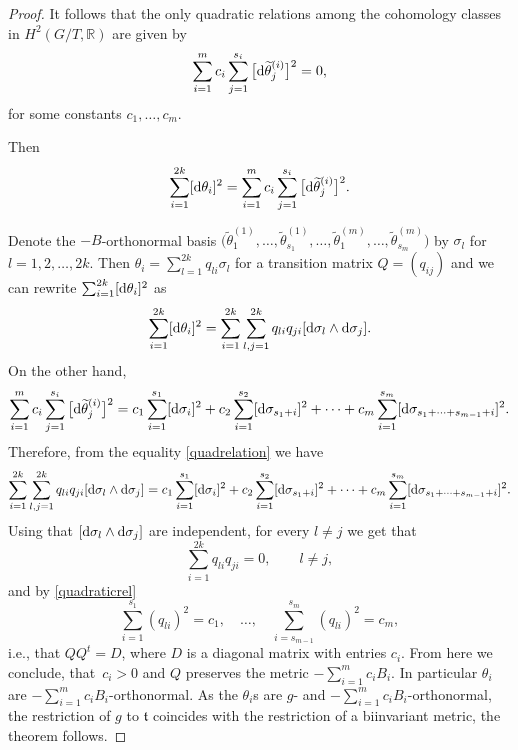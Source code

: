 \documentclass[10pt,a4paper]{amsart}
\numberwithin{equation}{section}
\begin{document}
\begin{proof}
It follows that the only quadratic relations among the cohomology classes in $H^2(G/T, \mathbb{R})$ are given by
\begin{equation}\label{quadraticrel}
 \sum_{i=1}^m c_i\sum_{j=1}^{s_i} \big[{\rm d}\widetilde{\theta}^{(i)}_j\big]^2 = 0, \end{equation} for some constants $c_1, \dots, c_m$.

Then
\begin{equation} \label{quadrelation}
\sum_{i=1}^{2k} [{\rm d}\theta_i]^2 = \sum_{i=1}^m c_i\sum_{j=1}^{s_i} \big[{\rm d}\widetilde{\theta}^{(i)}_j\big]^2.
\end{equation}

Denote the $-B$-orthonormal basis $\big(\widetilde{\theta}_1^{(1)}, \dots, \widetilde{\theta}_{s_1}^{(1)}, \dots, \widetilde{\theta}_1^{(m)}, \dots, \widetilde{\theta}_{s_m}^{(m)}\big)$ by $\sigma_l$ for $l=1,2,\dots ,2k$. Then $\theta_i = \sum_{l=1}^{2k} q_{li}\sigma_l$ for a transition matrix $Q = (q_{ij})$
and we can rewrite $\sum_{i=1}^{2k} [{\rm d}\theta_i]^2$ as
\[
\sum_{i=1}^{2k} [{\rm d}\theta_i]^2 = \sum_{i = 1}^{2k} \sum_{l,j =1}^{2k} q_{li} q_{ji} [{\rm d}\sigma_l \wedge {\rm d} \sigma_j].
\]
 On the other hand,
\[
 \sum_{i=1}^m c_i\sum_{j=1}^{s_i} \big[{\rm d}\widetilde{\theta}^{(i)}_j\big]^2 = c_1 \sum_{i =1}^{s_1} [{\rm d} \sigma_i]^2 + c_2 \sum_{i =1}^{s_2} [{\rm d} \sigma_{s_1 +i}]^2 + \dots + c_m \sum_{i =1}^{s_m} [{\rm d} \sigma_{s_1 + \dots + s_{m-1} + i} ]^2.
\]
Therefore, from the equality \eqref{quadrelation} we have
\[
 \sum_{i = 1}^{2k} \sum_{l,j =1}^{2k} q_{li} q_{ji} [{\rm d} \sigma_l \wedge {\rm d} \sigma_j] = c_1 \sum_{i =1}^{s_1} [{\rm d} \sigma_i]^2 + c_2 \sum_{i =1}^{s_2} [{\rm d} \sigma_{s_1 +i}]^2 + \dots + c_m \sum_{i =1}^{s_m} [{\rm d} \sigma_{s_1 + \dots + s_{m-1} + i} ]^2.
\]
Using that $[{\rm d}\sigma_l\wedge {\rm d}\sigma_j]$ are independent, for every $l\neq j$ we get that
\[
\sum_{i = 1}^{2k} q_{li} q_{ji} =0, \qquad l \neq j,
\]
and by \eqref{quadraticrel}
\[
\sum_{i =1}^{s_1} (q_{li})^2 = c_1, \quad \dots, \quad \sum_{i =s_{m-1}}^{s_m} (q_{li})^2 = c_m,
\]
i.e., that $QQ^t= D$, where $D$ is a diagonal matrix with entries $c_i$. From here we conclude, that~$c_i > 0$ and $Q$ preserves the metric $-\sum_{i = 1}^m c_i B_i$. In particular $\theta_i$ are $-\sum_{i=1}^m c_i B_i$-or\-thonor\-mal. As the $\theta_i$s are $g$- and $-\sum_{i=1}^m c_i B_i$-orthonormal, the restriction of $g$ to $\mathfrak t$ coincides with the restriction of a biinvariant metric, the theorem follows.
\end{proof}
\end{document}
